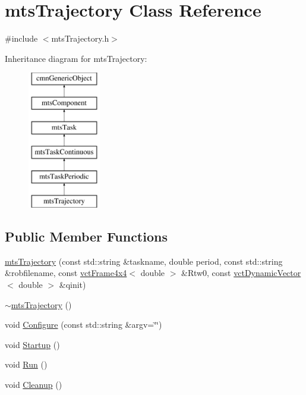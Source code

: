 \hypertarget{classmts_trajectory}{}\section{mts\+Trajectory Class Reference}
\label{classmts_trajectory}


{\ttfamily \#include $<$mts\+Trajectory.\+h$>$}

Inheritance diagram for mts\+Trajectory\+:\begin{figure}[H]
\begin{center}
\leavevmode
\includegraphics[height=6.000000cm]{d0/d7b/classmts_trajectory}
\end{center}
\end{figure}
\subsection*{Public Member Functions}
\begin{DoxyCompactItemize}
\item 
\hyperlink{classmts_trajectory_a7f02740b9adc62af004c329efdb6373a}{mts\+Trajectory} (const std\+::string \&taskname, double period, const std\+::string \&robfilename, const \hyperlink{classvct_frame4x4}{vct\+Frame4x4}$<$ double $>$ \&Rtw0, const \hyperlink{classvct_dynamic_vector}{vct\+Dynamic\+Vector}$<$ double $>$ \&qinit)
\item 
\hyperlink{classmts_trajectory_a33aa52f55b57b44628dd287f0ba474ed}{$\sim$mts\+Trajectory} ()
\item 
void \hyperlink{classmts_trajectory_a0cfd2f6b4f9922be488d218ebc980ab0}{Configure} (const std\+::string \&argv=\char`\"{}\char`\"{})
\item 
void \hyperlink{classmts_trajectory_a2e179e7bde40a3df6ad3201b0ea5cc69}{Startup} ()
\item 
void \hyperlink{classmts_trajectory_a4b4b3112c8dd657f8a986a161adaff00}{Run} ()
\item 
void \hyperlink{classmts_trajectory_af4b9e7a04714ded3f8b9a9a6a6d66354}{Cleanup} ()
\end{DoxyCompactItemize}

